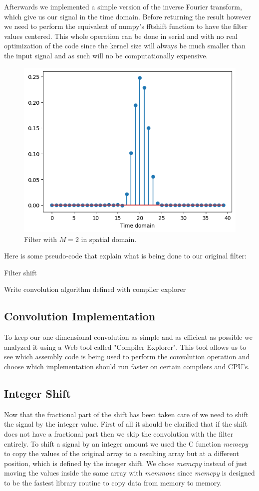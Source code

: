 \documentclass[]{usiinfbachelorproject}
\begin{document}
		 Afterwards we implemented a simple version of the inverse Fourier transform, which give us our signal in the time domain. Before returning the result however we need to perform the equivalent of numpy's fftshift function to have the filter values centered. This whole operation can be done in serial and with no real optimization of the code since the kernel size will always be much smaller than the input signal and as such will no be computationally expensive.
		 \begin{figure}[h]
		 	\centering
		 	\includegraphics[width=0.4\columnwidth]{images/ifft_filter_m_2_25_shift.png}
		 	\caption{Filter with $M=2$ in spatial domain.}
		 	\label{final_filter}
		 \end{figure}
		 
		 
		
		Here is some pseudo-code that explain what is being done to our original filter:
		\begin{algorithm}
			\caption{Filter shift}\label{alg:cap}
			Write convolution algorithm defined with compiler explorer
		\end{algorithm}
		
		
		\subsection{Convolution Implementation}
		To keep our one dimensional convolution as simple and as efficient as possible we analyzed it using a Web tool called "Compiler Explorer"\cite{godbolt}. This tool allows us to see which assembly code is being used to perform the convolution operation and choose which implementation should run faster on certain compilers and CPU's.
		
		
		
		\subsection{Integer Shift}
		Now that the fractional part of the shift has been taken care of we need to shift the signal by the integer value.
		First of all it should be clarified that if the shift does not have a fractional part then we skip the convolution with the filter entirely.
		To shift a signal by an integer amount we used the C function \textsl{memcpy} to copy the values of the original array to a resulting array but at a different position, which is defined by the integer shift. We chose \textsl{memcpy} instead of just moving the values inside the same array with \textsl{memmove} since \textsl{memcpy} is designed to be the fastest library routine to copy data from memory to memory.
		
\end{document}

